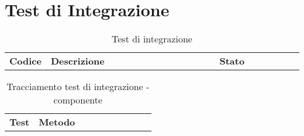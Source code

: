 \documentclass[PianoDiQualifica.tex]{subfiles}
\begin{document}
\chapter{Test di Integrazione}


\begin{table}[H]
	\begin{center}
		\begin{tabu} to 
			\tableHeaderStyle			
			\textbf{Codice} & \textbf{Descrizione} & \textbf{Stato} \\
			
		\end{tabu}
		\caption{Test di integrazione}
		\vspace{-1em}
	\end{center}
\end{table}	

\begin{table}[H]
	\begin{center}
		\begin{tabu} to 
			\tableHeaderStyle			
			\textbf{Test} & \textbf{Metodo} \\
			
		\end{tabu}
		\caption{Tracciamento test di integrazione - componente}
		\vspace{-1em}
	\end{center}
\end{table}	
\end{document}
